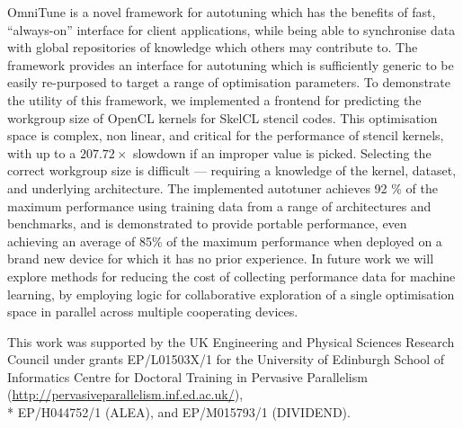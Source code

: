 \documentclass[nonatbib,preprint,9pt]{sigplanconf}
\begin{document}
OmniTune is a novel framework for autotuning which has the benefits of
fast, ``always-on'' interface for client applications, while being
able to synchronise data with global repositories of knowledge which
others may contribute to. The framework provides an interface for
autotuning which is sufficiently generic to be easily re-purposed to
target a range of optimisation parameters. To demonstrate the utility
of this framework, we implemented a frontend for predicting the
workgroup size of OpenCL kernels for SkelCL stencil codes. This
optimisation space is complex, non linear, and critical for the
performance of stencil kernels, with up to a $207.72\times$ slowdown
if an improper value is picked. Selecting the correct workgroup size
is difficult --- requiring a knowledge of the kernel, dataset, and
underlying architecture. The implemented autotuner achieves 92 \% of
the maximum performance using training data from a range of
architectures and benchmarks, and is demonstrated to provide portable
performance, even achieving an average of 85\% of the maximum
performance when deployed on a brand new device for which it has no
prior experience. In future work we will explore methods for reducing
the cost of collecting performance data for machine learning, by
employing logic for collaborative exploration of a single optimisation
space in parallel across multiple cooperating devices.

\acks

This work was supported by the UK Engineering and Physical Sciences
Research Council under grants EP/L01503X/1 for the University of
Edinburgh School of Informatics Centre for Doctoral Training in
Pervasive Parallelism
(\url{http://pervasiveparallelism.inf.ed.ac.uk/}),\\* EP/H044752/1
(ALEA), and EP/M015793/1 (DIVIDEND).

\label{bibliography}
\printbibliography
\end{document}
